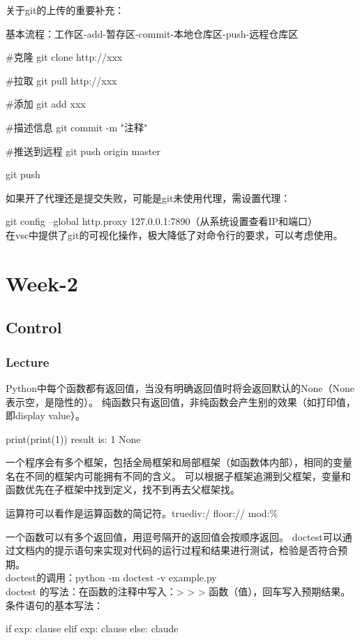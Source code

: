 \documentclass{ctexart}
\begin{document}
关于git的上传的重要补充：

基本流程：工作区-add-暂存区-commit-本地仓库区-push-远程仓库区

\begin{python}
#克隆
git clone http://xxx

#拉取
git pull http://xxx

#添加
git add xxx

#描述信息
git commit -m "注释"

#推送到远程
git push origin master

git push
\end{python}
如果开了代理还是提交失败，可能是git未使用代理，需设置代理：

git config --global http.proxy 127.0.0.1:7890（从系统设置查看IP和端口）
\\在vsc中提供了git的可视化操作，极大降低了对命令行的要求，可以考虑使用。
\section{Week-2}

\subsection{Control}

\subsubsection{Lecture}

Python中每个函数都有返回值，当没有明确返回值时将会返回默认的None（None表示空，是隐性的）。
纯函数只有返回值，非纯函数会产生别的效果（如打印值，即display value）。
\begin{python}
    print(print(1))
    result is:
    1
    None
\end{python}
一个程序会有多个框架，包括全局框架和局部框架（如函数体内部），相同的变量名在不同的框架内可能拥有不同的含义。
可以根据子框架追溯到父框架，变量和函数优先在子框架中找到定义，找不到再去父框架找。

运算符可以看作是运算函数的简记符。truediv:/   floor://   mod:\%

一个函数可以有多个返回值，用逗号隔开的返回值会按顺序返回。
doctest可以通过文档内的提示语句来实现对代码的运行过程和结果进行测试，检验是否符合预期。
\\doctest的调用：python -m doctest -v example.py
\\doctest 的写法：在函数的注释中写入：> >  > 函数（值），回车写入预期结果。
条件语句的基本写法：
\begin{python}
    if exp:
        clause
    elif exp:
        clause
    else:
        claude
\end{python}
\end{document}
